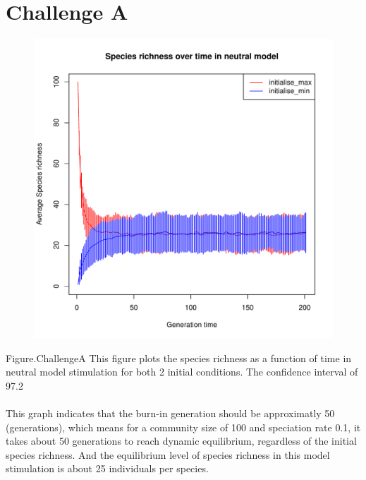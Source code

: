 \documentclass[12pt,a4paper]{article}
\begin{document}
\section{Challenge A}
\begin{figure}[h]
\centering
\includegraphics[width=\textwidth]{challengeA.pdf}
\end{figure}
Figure.ChallengeA This figure plots the species richness as a function of time in neutral model stimulation for both 2 initial
conditions. The confidence interval of 97.2%
\\
\\
This graph indicates that the burn-in generation should be approximatly 50 (generations), 
which means for a community size of 100 and speciation rate 0.1, it takes about 50 generations to reach dynamic equilibrium, regardless of the initial species richness.
And the equilibrium level of species richness in this model stimulation is about 25 individuals per species.



\newpage
\end{document}

